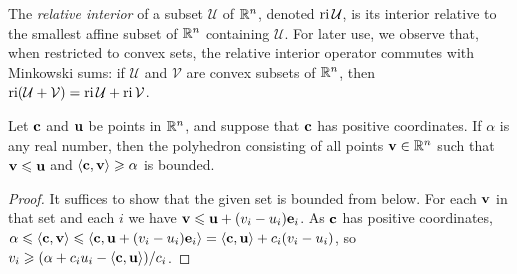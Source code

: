 \documentclass[11pt]{amsart}
\begin{document}
The \emph{relative interior} of a subset $\mathcal{U}$ of $\mathbb{R}^n$, denoted $\operatorname{ri} \mathcal{U}$, is its interior relative to the smallest affine subset of $\mathbb{R}^n$ containing $\mathcal{U}$.
For later use, we observe that, when restricted to convex sets, the relative interior operator commutes with Minkowski sums: if $\mathcal{U}$ and $\mathcal{V}$ are convex subsets of $\mathbb{R}^n$, then $\operatorname{ri}(\mathcal{U}+\mathcal{V})=\operatorname{ri} \mathcal{U}+\operatorname{ri} \mathcal{V}$.

\begin{proposition}
   \label{bounded polytope: P}
   Let $\mathbf{c}$ and $\mathbf{u}$ be points in $\mathbb{R}^n$, and suppose that $\mathbf{c}$ has positive coordinates.
   If $\alpha$ is any real number, then the polyhedron consisting of all points $\mathbf{v} \in \mathbb{R}^n$ such that  $\mathbf{v} \leqslant \mathbf{u}$ and $\langle \mathbf{c}, \mathbf{v} \rangle \geqslant \alpha$ is bounded.
\end{proposition}

\begin{proof}
   It suffices to show that the given set is bounded from below.
   For each $\mathbf{v}$ in that set and each $i$ we have $\mathbf{v}\leqslant \mathbf{u} + (v_i - u_i)\mathbf{e}_i$.
   As $\mathbf{c}$ has positive coordinates, $\alpha\leqslant \langle \mathbf{c}, \mathbf{v} \rangle\leqslant \langle \mathbf{c}, \mathbf{u} + (v_i -u_i)\mathbf{e}_i \rangle =
  \langle \mathbf{c}, \mathbf{u} \rangle + c_i(v_i - u_i)$, so $v_i \geqslant (\alpha + c_iu_i - \langle \mathbf{c}, \mathbf{u} \rangle)/c_i$.
\end{proof}
\end{document}
